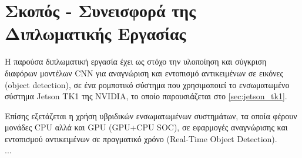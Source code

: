 \section{Σκοπός - Συνεισφορά της Διπλωματικής Εργασίας}
\label{section:contribution}
Η παρούσα διπλωματική εργασία  έχει ως στόχο την υλοποίηση και σύγκριση διαφόρων
μοντέλων CNN για αναγνώριση και εντοπισμό αντικειμένων σε εικόνες
(object detection), σε ένα ρομποτικό σύστημα που χρησιμοποιεί το
ενσωματωμένο σύστημα Jetson TK1 της NVIDIA, το οποίο παρουσιάζεται
στο \autoref{sec:jetson_tk1}.

Επίσης εξετάζεται η χρήση υβριδικών ενσωματωμένων συστημάτων, τα οποία
φέρουν μονάδες CPU αλλά και GPU (GPU+CPU SOC), σε εφαρμογές αναγνώρισης
και εντοπισμού αντικειμένων σε πραγματικό χρόνο (Real-Time Object Detection).
\\

...


